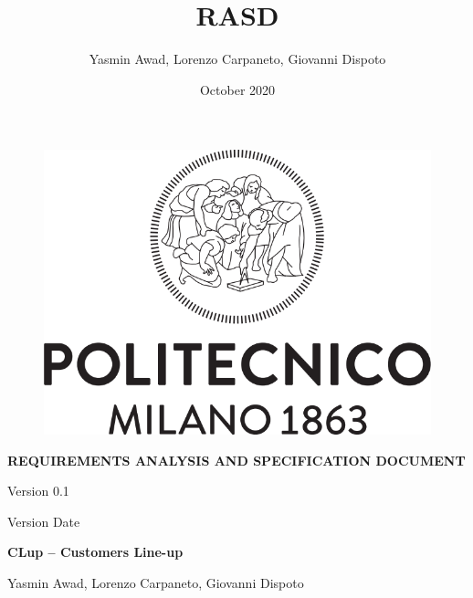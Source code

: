 \documentclass[a4paper, 10pt, oneside]{article}
\title{RASD}
\author{Yasmin Awad, Lorenzo Carpaneto, Giovanni Dispoto}
\date{October 2020}
\begin{document}
\begin{titlepage}
\vspace*{\fill}
\begin{figure}[h!]
    \centering
    \includegraphics[scale=0.5]{img/logopoli.png}
\end{figure}
\vspace{0.7em}
\begin{center}
    \Large \textbf{REQUIREMENTS ANALYSIS AND SPECIFICATION DOCUMENT}
\end{center}
\begin{center}
    \large Version 0.1
\end{center}
\begin{center}
    \large Version Date
\end{center}
\vspace{0.4em}
\begin{center}
    \Large \textbf{CLup – Customers Line-up } 
\end{center}
\vspace{-0.6em}
\begin{center}
    \normalsize Yasmin Awad, Lorenzo Carpaneto, Giovanni Dispoto
\end{center}
\vspace*{\fill}
\end{titlepage}

\normalsize


\newpage
\tableofcontents
\newpage
\end{document}
